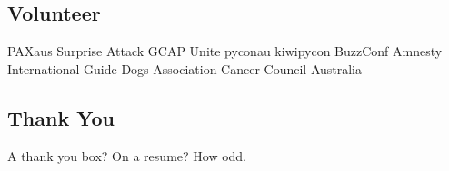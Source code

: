 \documentclass[a4paper]{deedy-resume} %
\begin{document}
\begin{minipage}[t]{0.33\textwidth}
\sectionspace
\subsection{Volunteer} %
PAXaus \textbullet{} Surprise Attack \textbullet{} GCAP \textbullet{} Unite \textbullet{}
pyconau \textbullet{} kiwipycon \textbullet{} BuzzConf \textbullet{} Amnesty International
\textbullet{} Guide Dogs Association \textbullet{} Cancer Council Australia \\

\sectionspace %

\sectionspace
\subsection{Thank You}
A thank you box? On a resume? How odd.

\end{minipage} %
\hfill
\end{document}
